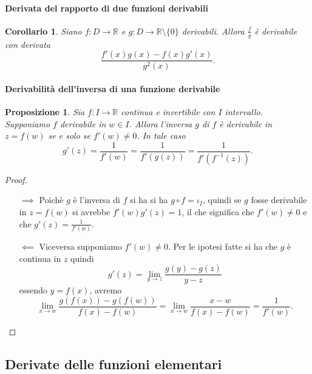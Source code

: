 \documentclass{article}
\theoremstyle{plain}
\newtheorem{prop}[thm]{Proposizione}
\newtheorem{cor}{Corollario}
\theoremstyle{definition}
\theoremstyle{remark}
\begin{document}
\vspace{10pt}

\paragraph{Derivata del rapporto di due funzioni derivabili}
\begin{bxthm}
\begin{cor}
    Siano $f:D\to\mathbb{R}$ e $g:D\to\mathbb{R}\setminus\{0\}$ derivabili. Allora 
    $\frac{f}{g}$ è derivabile con derivata \[\dfrac{f'(x)g(x)-f(x)g'(x)}{g^2(x)}.\]
\end{cor}
\end{bxthm}

\vspace{10pt}

\paragraph{Derivabilità dell'inversa di una funzione derivabile}
\begin{bxthm}
\begin{prop}
    Sia $f:I\to\mathbb{R}$ continua e invertibile con $I$ intervallo. Supponiamo $f$ derivabile in $w\in I$.
    Allora l'inversa $g$ di $f$ è derivabile in $z=f(w)$ se e solo se $f'(w)\neq0$. 
    In tale caso \[g'(z)=\dfrac{1}{f'(w)}=\dfrac{1}{f'(g(z))}=\dfrac{1}{f'(f^{-1}(z))}.\]
\end{prop}
\end{bxthm}
\begin{proof}\hfill
    \begin{itemize}
        \item[$\implies$]
        Poichè $g$ è l'inversa di $f$ si ha  si ha $g\circ f=\iota_I$, quindi se $g$ fosse derivabile in $z=f(w)$ si avrebbe $f'(w)g'(z)=1$, 
        il che significa che $f'(w)\neq0$ e che $g'(z)=\frac{1}{f'(w)}$. 
        \item[$\impliedby$]
        Viceversa supponiamo $f'(w)\neq0$. 
        Per le ipotesi fatte si ha che $g$ è continua in $z$ quindi 
        \[g'(z)=\lim_{y\to z}\dfrac{g(y)-g(z)}{y-z}\]
        essendo $y=f(x)$, avremo
        \[\lim_{x\to w}\dfrac{g(f(x))-g(f(w))}{f(x)-f(w)}=\lim_{x\to w}\dfrac{x-w}{f(x)-f(w)}=\dfrac{1}{f'(w)}.\]
    \end{itemize}
\end{proof}

\vspace{10pt}

\subsection{Derivate delle funzioni elementari}
\end{document}
